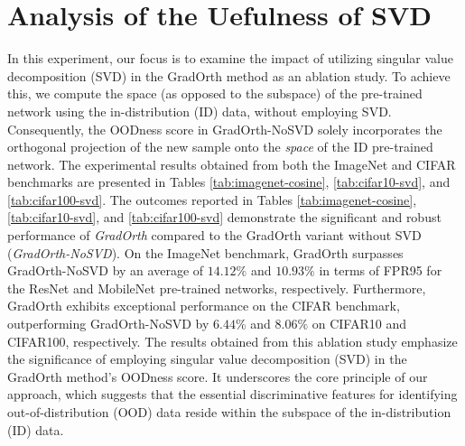 \documentclass{article}
\begin{document}
\section{Analysis of the Uefulness of SVD}
\label{app:ablation}
In this experiment, our focus is to examine the impact of utilizing singular value decomposition (SVD) in the GradOrth method as an ablation study. To achieve this, we compute the space (as opposed to the subspace) of the pre-trained network using the in-distribution (ID) data, without employing SVD. Consequently, the OODness score in GradOrth-NoSVD solely incorporates the orthogonal projection of the new sample onto the \textit{space} of the ID pre-trained network. The experimental results obtained from both the ImageNet and CIFAR benchmarks are presented in Tables \ref{tab:imagenet-cosine}, \ref{tab:cifar10-svd}, and \ref{tab:cifar100-svd}.
The outcomes reported in Tables \ref{tab:imagenet-cosine}, \ref{tab:cifar10-svd}, and \ref{tab:cifar100-svd} demonstrate the significant and robust performance of \textit{GradOrth} compared to the GradOrth variant without SVD (\textit{GradOrth-NoSVD}). On the ImageNet benchmark, GradOrth surpasses GradOrth-NoSVD by an average of $14.12\%$ and $10.93\%$ in terms of FPR95 for the ResNet and MobileNet pre-trained networks, respectively. Furthermore, GradOrth exhibits exceptional performance on the CIFAR benchmark, outperforming GradOrth-NoSVD by $6.44\%$ and $8.06\%$ on CIFAR10 and CIFAR100, respectively. 
The results obtained from this ablation study emphasize the significance of employing singular value decomposition (SVD) in the GradOrth method's OODness score. It underscores the core principle of our approach, which suggests that the essential discriminative features for identifying out-of-distribution (OOD) data reside within the subspace of the in-distribution (ID) data.
\end{document}
